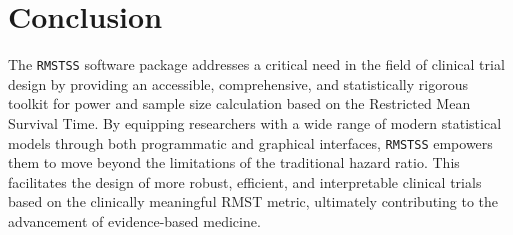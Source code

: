 \documentclass[11pt, a4paper]{article}
\begin{document}
\section{Conclusion}
The \texttt{RMSTSS} software package addresses a critical need in the field of clinical trial design by providing an accessible, comprehensive, and statistically rigorous toolkit for power and sample size calculation based on the Restricted Mean Survival Time. By equipping researchers with a wide range of modern statistical models through both programmatic and graphical interfaces, \texttt{RMSTSS} empowers them to move beyond the limitations of the traditional hazard ratio. This facilitates the design of more robust, efficient, and interpretable clinical trials based on the clinically meaningful RMST metric, ultimately contributing to the advancement of evidence-based medicine.


\end{document}
